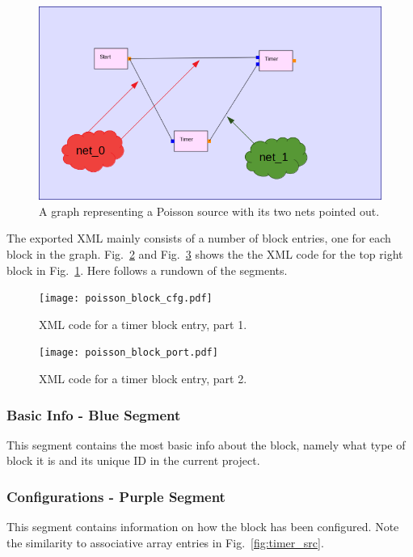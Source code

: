 \documentclass[journal,comsoc]{IEEEtran}
\begin{document}
\begin{figure}[!t]
    \centering
    \includegraphics[width=\columnwidth]{poisson_nets.png}
    \caption{A graph representing a Poisson source with its two nets pointed out.}
    \label{fig:net}
\end{figure}

The exported XML mainly consists of a number of block entries, one for each block in the graph.
Fig.~\ref{fig:xml1} and Fig.~\ref{fig:xml2} shows the the XML code for the top right block in
Fig.~\ref{fig:net}. Here follows a rundown of the segments.
\begin{figure}[!t]
    \centering
    \texttt{[image: poisson\_block\_cfg.pdf]}
    \caption{XML code for a timer block entry, part 1.}
    \label{fig:xml1}
\end{figure}
\begin{figure}[!t]
    \centering
    \texttt{[image: poisson\_block\_port.pdf]}
    \caption{XML code for a timer block entry, part 2.}
    \label{fig:xml2}
\end{figure}

\subsubsection{Basic Info - Blue Segment}
This segment contains the most basic info about the block, namely
what type of block it is and its unique ID in the current project.

\subsubsection{Configurations - Purple Segment}
This segment contains information on how the block has been configured. Note
the similarity to associative array entries in Fig.~\ref{fig:timer_src}.
\end{document}
